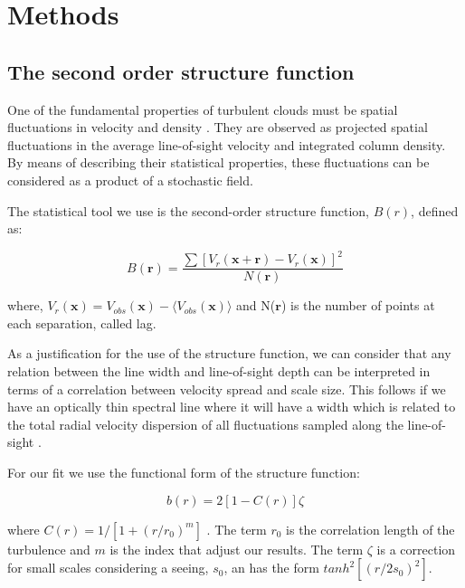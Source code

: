 \documentclass[fleqn,usenatbib, useAMS, a4paper]{mnras}
\begin{document}
\section{Methods}\label{sec:met}

\subsection{The second order structure function}

One of the fundamental properties of turbulent clouds must be spatial fluctuations in velocity and density \citep{1984ApJ...277..556S}.
They are observed as projected spatial fluctuations in the average line-of-sight velocity and integrated column density.
By means of describing their statistical properties, these fluctuations can be considered as a product of a stochastic  field.

The statistical tool we use is the second-order structure function, $B(r)$, defined as:

\begin{equation}\label{eq:S}
B(\boldsymbol{r})=\dfrac{\sum[V_{r}(\boldsymbol{x}+\boldsymbol{r})-V_{r}(\boldsymbol{x}) ]^{2}}{N(\boldsymbol{r})}
\end{equation}

where, $V_{r}(\boldsymbol{x})= V_{obs}(\boldsymbol{x})-\langle V_{obs}(\boldsymbol{x}) \rangle$ and N($\boldsymbol{r}$) is the number of points at each separation, called lag.


As a justification for the use of the structure function, we can consider that any relation between the line width and line-of-sight depth can be interpreted in terms of a correlation between velocity spread and scale size.
This follows if we have an optically thin spectral line where it will have a width which is related to the total radial velocity dispersion of all fluctuations sampled along the line-of-sight \citep{1984ApJ...277..556S}.

For our fit we use the functional form of the structure function:

\begin{equation}\label{eq:b}
b(r)=2[1-C(r)]\zeta
\end{equation}

where $C(r)=1/[1+(r/r_{0})^{m}]$ \citep{1984ApJ...277..556S,arthur2016turbulence}.
The term $r_{0}$ is the correlation length of the turbulence and $m$ is the index that adjust our results.
The term $\zeta$ is a correction for small scales considering a seeing, $s_{0}$, an has the form $tanh^{2}[(r/2s_{0})^2]$.
\end{document}
